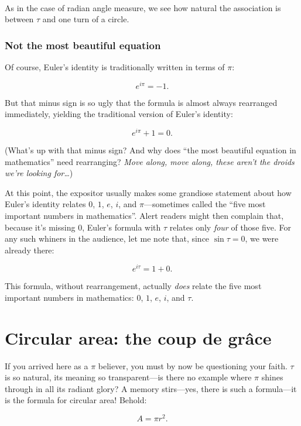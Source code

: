 \documentclass{article}
\begin{document}
\\

\noindent As in the case of radian angle measure, we see how natural the association is between $\tau$ and one turn of a circle.

    \subsubsection{Not the most beautiful equation} %

Of course, Euler's identity is traditionally written in terms of $\pi$:


\[ e^{i\pi} = -1. \]

\noindent But that minus sign is so ugly that the formula is almost always rearranged immediately, yielding the traditional version of Euler's identity:

\[ e^{i\pi} + 1 = 0. \]

\noindent (What's up with that minus sign? And why does ``the most beautiful equation in mathematics'' need rearranging? \emph{Move along, move along, these aren't the droids we're looking for\ldots})

At this point, the expositor usually makes some grandiose statement about how Euler's identity relates $0$, $1$, $e$, $i$, and $\pi$---sometimes called the ``five most important numbers in mathematics''. Alert readers might then complain that, because it's missing $0$, Euler's formula with $\tau$ relates only \emph{four} of those five. For any such whiners in the audience, let me note that, since $\sin\tau = 0$, we were already there:

\[ e^{i\tau} = 1 + 0. \]

\noindent This formula, without rearrangement, actually \emph{does} relate the five most important numbers in mathematics: $0$, $1$, $e$, $i$, and $\tau$.

\section{Circular area: the coup de gr\^{a}ce} %
\label{sec:circular_area}

If you arrived here as a $\pi$ believer, you must by now be questioning your faith. $\tau$ is so natural, its meaning so transparent---is there no example where $\pi$ shines through in all its radiant glory? A memory stirs---yes, there is such a formula---it is the formula for circular area! Behold:

\[ A = \pi r^2. \]
\end{document}

